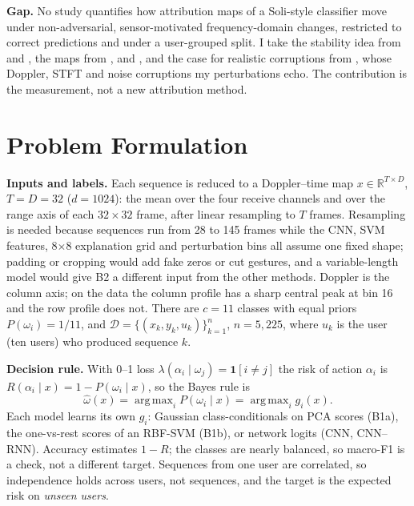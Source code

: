 \documentclass[11pt]{article}
\DeclareMathOperator*{\argmax}{arg\,max}
\begin{document}
\textbf{Gap.} No study quantifies how attribution maps of a Soli-style classifier move under non-adversarial, sensor-motivated frequency-domain changes, restricted to correct predictions and under a user-grouped split. I take the stability idea from \citet{agarwal2022rethinking} and \citet{yeh2019infidelity}, the maps from \citet{selvaraju2017gradcam}, \citet{sundararajan2017ig} and \citet{fisher2019allmodels}, and the case for realistic corruptions from \citet{zhou2024corruption}, whose Doppler, STFT and noise corruptions my perturbations echo. The contribution is the measurement, not a new attribution method.

\section{Problem Formulation}\label{sec:form}
\textbf{Inputs and labels.} Each sequence is reduced to a Doppler--time map $x\in\mathbb{R}^{T\times D}$, $T=D=32$ ($d=1024$): the mean over the four receive channels and over the range axis of each $32\times32$ frame, after linear resampling to $T$ frames. Resampling is needed because sequences run from 28 to 145 frames while the CNN, SVM features, 8$\times$8 explanation grid and perturbation bins all assume one fixed shape; padding or cropping would add fake zeros or cut gestures, and a variable-length model would give B2 a different input from the other methods. Doppler is the column axis; on the data the column profile has a sharp central peak at bin 16 and the row profile does not. There are $c=11$ classes with equal priors $P(\omega_i)=1/11$, and $\mathcal D=\{(x_k,y_k,u_k)\}_{k=1}^{n}$, $n=5{,}225$, where $u_k$ is the user (ten users) who produced sequence $k$.

\textbf{Decision rule.} With 0--1 loss $\lambda(\alpha_i\mid\omega_j)=\mathbf 1[i\neq j]$ the risk of action $\alpha_i$ is $R(\alpha_i\mid x)=1-P(\omega_i\mid x)$, so the Bayes rule is
\begin{equation}
\hat\omega(x)=\argmax_{i} P(\omega_i\mid x)=\argmax_i g_i(x).
\label{eq:bayes}
\end{equation}
Each model learns its own $g_i$: Gaussian class-conditionals on PCA scores (B1a), the one-vs-rest scores of an RBF-SVM (B1b), or network logits (CNN, CNN--RNN). Accuracy estimates $1-R$; the classes are nearly balanced, so macro-F1 is a check, not a different target. Sequences from one user are correlated, so independence holds across users, not sequences, and the target is the expected risk on \emph{unseen users}.
\end{document}
